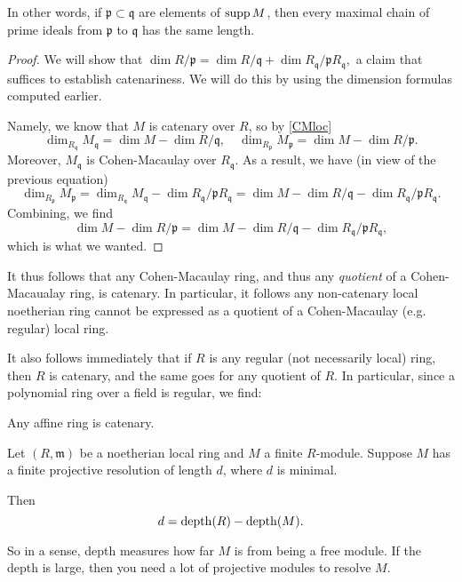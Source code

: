 In other words, if $\mathfrak{p} \subset \mathfrak{q}$ are elements of
$\operatorname{supp} M$, then every maximal chain of prime ideals from $\mathfrak{p}$ to
$\mathfrak{q}$ has the same length. 
\begin{proof} 
We will show that
\( \dim R/\mathfrak{p} = \dim R/\mathfrak{q} + \dim
R_{\mathfrak{q}}/\mathfrak{p} R_{\mathfrak{q}}, \) a claim that
suffices to establish catenariness.
We will do this by using the dimension formulas computed earlier.

Namely, we know that
$M$ is catenary over $R$, so  by \cref{CMloc}
\[ \dim_{R_{\mathfrak{q}}} M_{\mathfrak{q}} = \dim M - \dim
R/\mathfrak{q}, \quad
\dim_{ R_{\mathfrak{p}}} M_{\mathfrak{p}} = \dim M - \dim R/\mathfrak{p}.
\]
Moreover, $M_{\mathfrak{q}} $ is Cohen-Macaulay over
$R_{\mathfrak{q}}$. As a result, we have (in view of the previous equation)
\[ \dim_{R_{\mathfrak{p}}}
M_{\mathfrak{p}} = \dim_{R_{\mathfrak{q}}} M_{\mathfrak{q}} - \dim
R_{\mathfrak{q}}/\mathfrak{p}R_{\mathfrak{q}} = 
\dim M - \dim R/\mathfrak{q} - \dim
R_{\mathfrak{q}}/\mathfrak{p}R_{\mathfrak{q}} 
.  \]
Combining, we find
\[ \dim M - \dim R/\mathfrak{p} =  \dim M - \dim R/\mathfrak{q} - \dim
R_{\mathfrak{q}}/\mathfrak{p}R_{\mathfrak{q}} ,
 \]
which is what we wanted.
\end{proof} 

It thus follows that any Cohen-Macaulay ring, and thus any \emph{quotient} of a
Cohen-Macaualay ring, is catenary. In particular, it follows any non-catenary
local noetherian ring cannot be expressed as a quotient of a
Cohen-Macaulay (e.g. regular) local ring. 

It also follows immediately that if $R$ is any regular (not necessarily local)
ring, then $R$ is catenary, and the same goes for any quotient of $R$.
In particular, since a polynomial ring over a field is regular, we find:
\begin{proposition} 
Any affine ring is catenary. 
\end{proposition} 


\begin{theorem} Let $(R,
\mathfrak{m})$ be a
noetherian local ring and $M$ a finite $R$-module. Suppose $M$
has a finite
projective resolution of length $d$, where $d$ is minimal.

Then
\[ d = \operatorname{depth}(R) - \operatorname{depth}(M).  \]
\end{theorem}
So in a sense, depth measures how far $M$ is from being a free
module. If the
depth is large, then you need a lot of projective modules to
resolve $M$.

